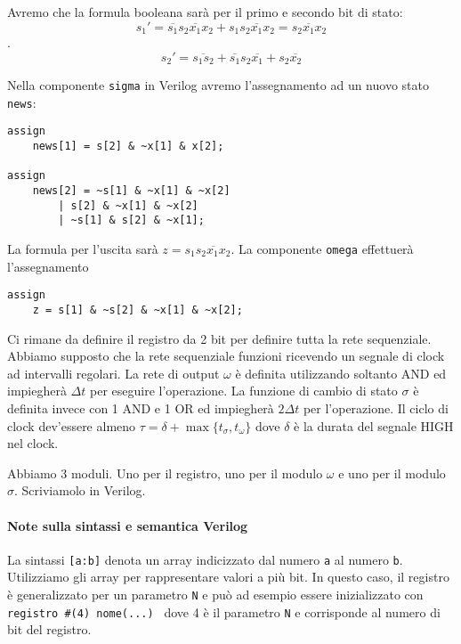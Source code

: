 Avremo che la formula booleana sarà per il primo e secondo bit di stato:
\[ s_1' = \overbar{s_1}s_2\overbar{x_1}x_2 + s_1s_2\overbar{x_1}x_2 = s_2\overbar{x_1}x_2 \]. 
\[ s_2' = \overbar{s_1s_2}+ \overbar{s_1}s_2\overbar{x_1} + s_2\overbar{x_2}\]

Nella componente \texttt{sigma} in Verilog avremo l'assegnamento ad un nuovo stato \texttt{news}:

\begin{lstlisting}[style={verilog}]
assign
	news[1] = s[2] & ~x[1] & x[2];

assign
	news[2] = ~s[1] & ~x[1] & ~x[2] 
		| s[2] & ~x[1] & ~x[2] 
		| ~s[1] & s[2] & ~x[1];
\end{lstlisting}

La formula per l'uscita sarà $ z = s_1\overbar{s_2x_1x_2} $. La componente \texttt{omega} effettuerà l'assegnamento

\begin{lstlisting}[style={verilog}]
assign
	z = s[1] & ~s[2] & ~x[1] & ~x[2];
\end{lstlisting}



 Ci rimane da definire il registro da 2 bit per definire tutta la rete sequenziale. Abbiamo supposto che la rete sequenziale funzioni ricevendo un segnale di clock ad intervalli regolari.
La rete di output $ \omega $ è definita utilizzando soltanto AND ed impiegherà $ \Delta t $ per eseguire l'operazione. La funzione di cambio di stato $ \sigma $ è definita invece con 1 AND e 1 OR ed impiegherà $ 2\Delta t $ per l'operazione.
Il ciclo di clock dev'essere almeno $ \tau = \delta + \max\{t_{\sigma}, t_{\omega}\} $ dove $ \delta $ è la durata del segnale HIGH nel clock.

Abbiamo 3 moduli. Uno per il registro, uno per il modulo $ \omega $ e uno per il modulo $ \sigma $. Scriviamolo in Verilog.

\paragraph{Note sulla sintassi e semantica Verilog}

La sintassi \texttt{[a:b]} denota un array indicizzato dal numero
\texttt{a} al numero \texttt{b}. Utilizziamo gli array per rappresentare valori a più bit. In questo caso, il registro è generalizzato per un parametro \texttt{N} e può ad esempio essere inizializzato con \texttt{registro \#(4) nome(...) }
dove 4 è il parametro \texttt{N} e corrisponde al numero di bit del registro.

